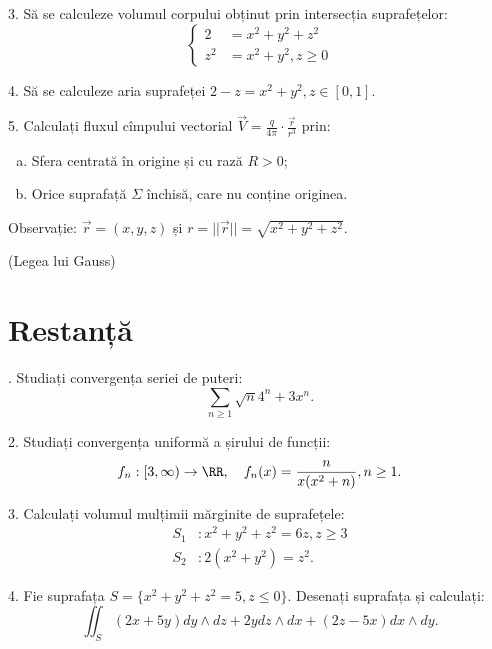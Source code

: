 3. Să se calculeze volumul corpului obținut prin intersecția suprafețelor:
\[
  \begin{cases}
    2 &= x^2 + y^2 + z^2 \\
    z^2 &= x^2 + y^2, z \geq 0
  \end{cases}
\]

\vspace{0.5cm}

4. Să se calculeze aria suprafeței $2 - z = x^2 + y^2, z \in [0, 1]$.

\vspace{0.5cm}

5. Calculați fluxul cîmpului vectorial $\vec{V} = \frac{q}{4 \pi} \cdot \frac{\vec{r}}{r^3}$
prin:
\begin{enumerate}[(a)]
\item Sfera centrată în origine și cu rază $R > 0$;
\item Orice suprafață $\Sigma$ închisă, care nu conține originea.
\end{enumerate}
Observație: $\vec{r} = (x, y, z)$ și $r = ||\vec{r}|| = \sqrt{x^2 + y^2 + z^2}$.

(Legea lui Gauss)

\section{Restanță}


\indent{}. Studiați convergența seriei de puteri:
\[
  \sum_{n \geq 1} \sqrt{n}{4^n + 3} x^n.
\]

\vspace{0.5cm}

2. Studiați convergența uniformă a șirului de funcții:
\[
  f_n : [3, \infty) \to \RR, \quad f_n(x) = \frac{n}{x(x^2 + n)}, n \geq 1.
\]

\vspace{0.5cm}

3. Calculați volumul mulțimii mărginite de suprafețele:
\begin{align*}
  S_1 &: x^2 + y^2 + z^2 = 6z, z \geq 3 \\
  S_2 &: 2(x^2 + y^2) = z^2.
\end{align*}

\vspace{0.5cm}

4. Fie suprafața $ S = \{ x^2 + y^2 + z^2 = 5, z \leq 0 \} $.
Desenați suprafața și calculați:
\[
  \iint_S (2x + 5y) dy \wedge dz + 2ydz \wedge dx + (2z - 5x) dx \wedge dy.
\]


